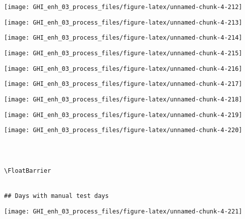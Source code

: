 \documentclass[
  10pt,
  a4paper,oneside]{article}
\begin{document}
\begin{center}\texttt{[image: GHI\_enh\_03\_process\_files/figure-latex/unnamed-chunk-4-212]} \end{center}

\begin{center}\texttt{[image: GHI\_enh\_03\_process\_files/figure-latex/unnamed-chunk-4-213]} \end{center}

\begin{center}\texttt{[image: GHI\_enh\_03\_process\_files/figure-latex/unnamed-chunk-4-214]} \end{center}

\begin{center}\texttt{[image: GHI\_enh\_03\_process\_files/figure-latex/unnamed-chunk-4-215]} \end{center}

\begin{center}\texttt{[image: GHI\_enh\_03\_process\_files/figure-latex/unnamed-chunk-4-216]} \end{center}

\begin{center}\texttt{[image: GHI\_enh\_03\_process\_files/figure-latex/unnamed-chunk-4-217]} \end{center}

\begin{center}\texttt{[image: GHI\_enh\_03\_process\_files/figure-latex/unnamed-chunk-4-218]} \end{center}

\begin{center}\texttt{[image: GHI\_enh\_03\_process\_files/figure-latex/unnamed-chunk-4-219]} \end{center}

\begin{center}\texttt{[image: GHI\_enh\_03\_process\_files/figure-latex/unnamed-chunk-4-220]} \end{center}

\begin{verbatim}
 
 

\FloatBarrier


## Days with manual test days 
\end{verbatim}

\begin{center}\texttt{[image: GHI\_enh\_03\_process\_files/figure-latex/unnamed-chunk-4-221]} \end{center}
\end{document}
